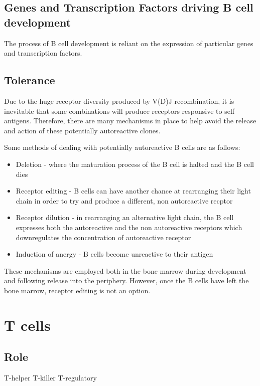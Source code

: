 \subsection{Genes and Transcription Factors driving B cell development}

The process of B cell development is reliant on the expression of particular genes and transcription factors.


\subsection{Tolerance}

Due to the huge receptor diversity produced by V(D)J recombination, it is inevitable that some combinations will produce receptors responsive to self antigens.
Therefore, there are many mechanisms in place to help avoid the release and action of these potentially autoreactive clones.

Some methods of dealing with potentially autoreactive B cells are as follows:
\begin{itemize}
\item Deletion - where the maturation process of the B cell is halted and the B cell dies \citep{Cornall1995}
\item Receptor editing - B cells can have another chance at rearranging their light chain in order to try and produce a different, non autoreactive recptor \citep{Orduno2009, Gay1993}
\item Receptor dilution - in rearranging an alternative light chain, the B cell expresses both the autoreactive and the non autoreactive receptors which downregulates the concentration of autoreactive receptor \citep{Gay1993, Orduno2009}
\item Induction of anergy - B cells become unreactive to their antigen \citep{Orduno2009}
\end{itemize}

These mechanisms are employed both in the bone marrow during development and following release into the periphery.
However, once the B cells have left the bone marrow, receptor editing is not an option.



\section{T cells}
\subsection{Role}
T-helper
T-killer
T-regulatory

